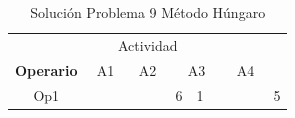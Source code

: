 \documentclass[12pt]{article}  %
\begin{document}
\begin{table}[H]
\centering
\caption{Solución Problema 9 Método Húngaro}
\label{tab:SolProb9}
\begin{tabular}{cccccccccccccc}
\multicolumn{14}{c}{Actividad}                                                                                                                                                                                                                                                                                                                                                                                                                                                                                                                                                                                                                                                                                                                                                                                                                                                                                                                                 \\ \cline{2-13}
\multicolumn{1}{c|}{\textbf{Operario}} & \multicolumn{3}{c|}{A1}                                                                                                                                                                                               & \multicolumn{3}{c|}{A2}                                                                                                                                                                                               & \multicolumn{3}{c|}{A3}                                                                                                                                                                                             & \multicolumn{3}{c|}{A4}                                                                                                                                                                                             & \multicolumn{1}{l}{}      \\ \cline{2-13}
\multicolumn{1}{c|}{Op1}               & \multicolumn{1}{c|}{\cellcolor[HTML]{67FD9A}}                         & \multicolumn{1}{c|}{\cellcolor[HTML]{FFCC67}}                         & \multicolumn{1}{c|}{\cellcolor[HTML]{FCFF2F}}                         & \multicolumn{1}{c|}{\cellcolor[HTML]{67FD9A}}                         & \multicolumn{1}{c|}{\cellcolor[HTML]{FFCC67}}                         & \multicolumn{1}{c|}{\cellcolor[HTML]{F8FF00}}                         & \multicolumn{1}{c|}{\cellcolor[HTML]{00D2CB}6}                       & \multicolumn{1}{c|}{\cellcolor[HTML]{00D2CB}1}                       & \multicolumn{1}{c|}{\cellcolor[HTML]{00D2CB}{\color[HTML]{FE0000} 0}} & \multicolumn{1}{c|}{\cellcolor[HTML]{67FD9A}{\color[HTML]{333333} }} & \multicolumn{1}{c|}{\cellcolor[HTML]{FFC702}{\color[HTML]{333333} }} & \multicolumn{1}{c|}{\cellcolor[HTML]{F8FF00}{\color[HTML]{333333} }}  & \cellcolor[HTML]{FFCCC9}5 \\ \cline{2-13}

\end{tabular}
\end{table}
\end{document}
